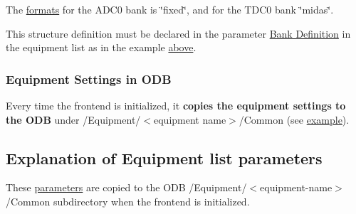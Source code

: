The \hyperlink{FE_table_FE_tbl_Format}{formats} for the ADC0 bank is \char`\"{}fixed\char`\"{}, and for the TDC0 bank \char`\"{}midas\char`\"{}.\par
 This structure definition must be declared in the parameter \hyperlink{FE_table_FE_tbl_BankDef}{Bank Definition} in the equipment list as in the example \hyperlink{FE_eqdec_FE_Example_equipment_structure}{above}.\par
 \par


\label{FE_eqdec_idx_Equipment_settings}
\hypertarget{FE_eqdec_idx_Equipment_settings}{}
 \hypertarget{FE_eqdec_FE_equipment_odb_common}{}\subsubsection{Equipment Settings in ODB}\label{FE_eqdec_FE_equipment_odb_common}
Every time the frontend is initialized, it {\bfseries copies the equipment settings to the ODB} under /Equipment/$<$equipment name$>$/Common (see \hyperlink{FE_eqdec_FE_scaler_common}{example}).\par
 \par


\par
 \label{index_end}
\hypertarget{index_end}{}


 \subsection{Explanation of Equipment list parameters}\label{FE_table}


\par
  These \hyperlink{structparameters}{parameters} are copied to the ODB /Equipment/$<$equipment-\/name$>$/Common subdirectory when the frontend is initialized.

